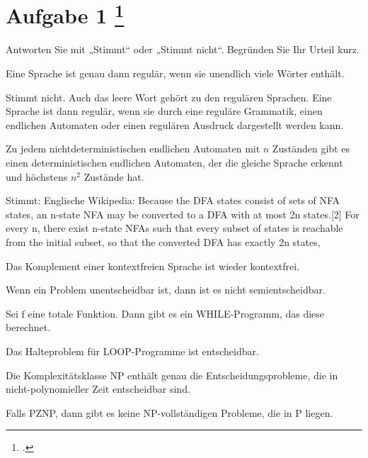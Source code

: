 \documentclass{lehramt-informatik-aufgabe}
\begin{document}
\section{Aufgabe 1
\footcite{66115:2020:09}}

Antworten Sie mit „Stimmt“ oder „Stimmt nicht“. Begründen Sie Ihr Urteil
kurz.

\begin{liAntwort}


\item Eine Sprache ist genau dann regulär, wenn sie unendlich viele
Wörter enthält.

\begin{liAntwort}
Stimmt nicht. Auch das leere Wort gehört zu den regulären Sprachen. Eine
Sprache ist dann regulär, wenn sie durch eine reguläre Grammatik,
einen endlichen Automaten oder einen regulären Ausdruck dargestellt
werden kann.
\end{liAntwort}


\item Zu jedem nichtdeterministischen endlichen Automaten mit $n$
Zuständen gibt es einen deterministischen endlichen Automaten, der die
gleiche Sprache erkennt und höchstens $n^2$ Zustände hat.

\begin{liAntwort}
Stimmt: Englische Wikipedia:
Because the DFA states consist of sets of NFA states, an n-state NFA may
be converted to a DFA with at most 2n states.[2] For every n, there
exist n-state NFAs such that every subset of states is reachable from
the initial subset, so that the converted DFA has exactly 2n states,
\end{liAntwort}


\item Das Komplement einer kontextfreien Sprache ist wieder kontextfrei.


\item Wenn ein Problem unentscheidbar ist, dann ist es nicht
semientscheidbar.


\item Sei f eine totale Funktion. Dann gibt es ein WHILE-Programm, das
diese berechnet.

\item Das Halteproblem für LOOP-Programme ist entscheidbar.


\item Die Komplexitätsklasse NP enthält genau die Entscheidungsprobleme,
die in nicht-polynomieller Zeit entscheidbar sind.


\item Falls PZNP, dann gibt es keine NP-vollständigen Probleme, die in P
liegen.
\end{liAntwort}
\end{document}
